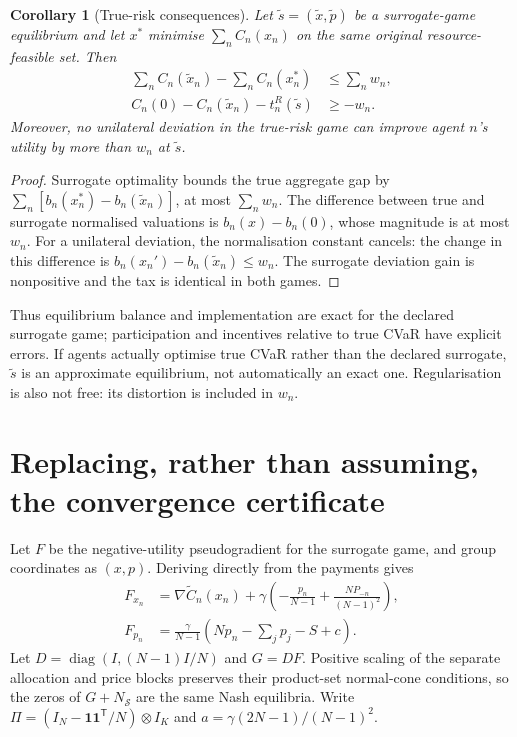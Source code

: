 \documentclass[11pt,a4paper]{article}
\newtheorem{corollary}{Corollary}
\newcommand{\one}{\mathbf 1}
\begin{document}
\begin{corollary}[True-risk consequences]
Let $\widetilde s=(\widetilde x,\widetilde p)$ be a surrogate-game
equilibrium and let $x^*$ minimise $\sum_n C_n(x_n)$ on the same original
resource-feasible set. Then
\begin{align}
 \sum_n C_n(\widetilde x_n)-\sum_n C_n(x_n^*)&\leq\sum_n w_n,\\
 C_n(0)-C_n(\widetilde x_n)-t_n^R(\widetilde s)&\geq-w_n.
\end{align}
Moreover, no unilateral deviation in the true-risk game can improve agent
$n$'s utility by more than $w_n$ at $\widetilde s$.
\end{corollary}
\begin{proof}
Surrogate optimality bounds the true aggregate gap by
$\sum_n[b_n(x_n^*)-b_n(\widetilde x_n)]$, at most $\sum_n w_n$.
The difference between true and surrogate normalised valuations is
$b_n(x)-b_n(0)$, whose magnitude is at most $w_n$. For a unilateral
deviation, the normalisation constant cancels: the change in this difference
is $b_n(x_n')-b_n(\widetilde x_n)\leq w_n$. The surrogate deviation gain
is nonpositive and the tax is identical in both games.
\end{proof}

Thus equilibrium balance and implementation are exact for the declared
surrogate game; participation and incentives relative to true CVaR have
explicit errors. If agents actually optimise true CVaR rather than the
declared surrogate, $\widetilde s$ is an approximate equilibrium, not
automatically an exact one. Regularisation is also not free: its distortion
is included in $w_n$.

\section{Replacing, rather than assuming, the convergence certificate}

Let $F$ be the negative-utility pseudogradient for the surrogate game,
and group coordinates as $(x,p)$. Deriving directly from the payments gives
\begin{align}
 F_{x_n}&=\nabla\widetilde C_n(x_n)
       +\gamma\left(-\frac{p_n}{N-1}
                   +\frac{N P_{-n}}{(N-1)^2}\right),\\
 F_{p_n}&=\frac{\gamma}{N-1}
                 \left(Np_n-\sum_jp_j-S+c\right).
 \label{eq:pseudogradient}
\end{align}
Let $D=\operatorname{diag}(I,(N-1)I/N)$ and $G=DF$. Positive scaling
of the separate allocation and price blocks preserves their product-set
normal-cone conditions, so the zeros of $G+N_{\mathcal S}$ are the same
Nash equilibria. Write $\Pi=(I_N-\one\one^{\mathsf T}/N)\otimes I_K$
and $a=\gamma(2N-1)/(N-1)^2$.
\end{document}
